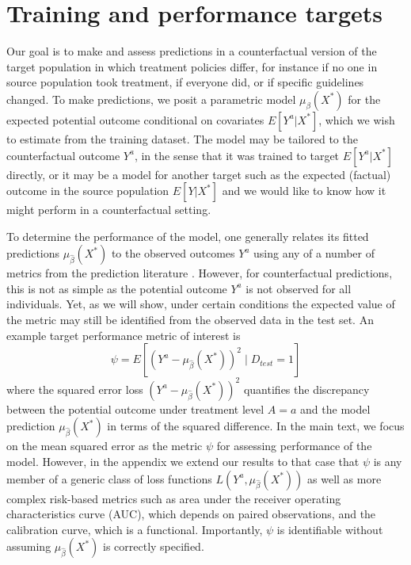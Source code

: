 \section{Training and performance targets} \label{sec:targets}
Our goal is to make and assess predictions in a counterfactual version of the target population in which treatment policies differ, for instance if no one in source population took treatment, if everyone did, or if specific guidelines changed. To make predictions, we posit a parametric model $\mu_{\beta}(X^*)$ for the expected potential outcome conditional on covariates $E[Y^a | X^*]$, which we wish to estimate from the training dataset. The model may be tailored to the counterfactual outcome $Y^a$, in the sense that it was trained to target $E[Y^a | X^*]$ directly, or it may be a model for another target such as the  expected (factual) outcome in the source population $E[Y | X^*]$ and we would like to know how it might perform in a counterfactual setting.

To determine the performance of the model, one generally relates its fitted predictions $\mu_{\widehat{\beta}}(X^*)$ to the observed outcomes $Y^a$ using any of a number of metrics from the prediction literature \cite{harrell_multivariable_1996,steyerberg_clinical_2019,altman_what_2000}. However, for counterfactual predictions, this is not as simple as the potential outcome $Y^a$ is not observed for all individuals. Yet, as we will show, under certain conditions the expected value of the metric may still be identified from the observed data in the test set. An example target performance metric of interest is 
\begin{equation*}
    \psi = E[(Y^a - \mu_{\widehat{\beta}}(X^*))^2 \mid D_{test} = 1]
\end{equation*}
where the squared error loss $(Y^a - \mu_{\widehat{\beta}}(X^*))^2$ quantifies the discrepancy between the potential outcome under treatment level $A = a$ and the model prediction $\mu_{\widehat{\beta}}(X^*)$ in terms of the squared difference. In the main text, we focus on the mean squared error as the metric $\psi$ for assessing performance of the model. However, in the appendix we extend our results to that case that $\psi$ is any member of a generic class of loss functions $L(Y^a,  \mu_{\widehat{\beta}}(X^*))$ as well as more complex risk-based metrics such as area under the receiver operating characteristics curve (AUC), which depends on paired observations, and the calibration curve, which is a functional. Importantly, $\psi$ is identifiable without assuming $\mu_{\widehat{\beta}}(X^*)$ is correctly specified.

